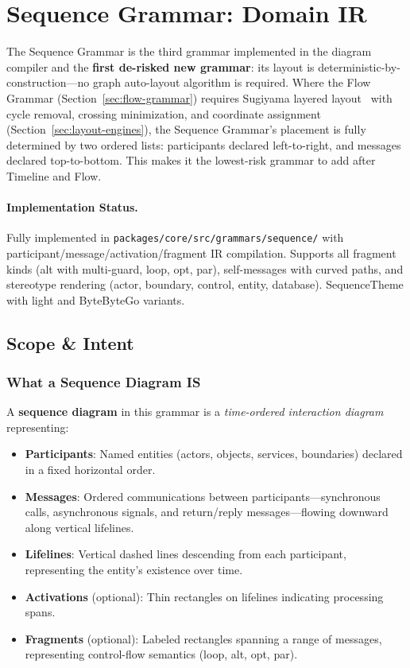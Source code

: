 \section{Sequence Grammar: Domain IR}
\label{sec:sequence-grammar}

The Sequence Grammar is the third grammar implemented in the diagram compiler and the \textbf{first de-risked new grammar}: its layout is deterministic-by-construction---no graph auto-layout algorithm is required. Where the Flow Grammar (Section~\ref{sec:flow-grammar}) requires Sugiyama layered layout~\cite{sugiyama1981} with cycle removal, crossing minimization, and coordinate assignment (Section~\ref{sec:layout-engines}), the Sequence Grammar's placement is fully determined by two ordered lists: participants declared left-to-right, and messages declared top-to-bottom. This makes it the lowest-risk grammar to add after Timeline and Flow.

\paragraph{Implementation Status.}
Fully implemented in \texttt{packages/core/src/grammars/sequence/} with participant/message/activation/fragment IR compilation. Supports all fragment kinds (alt with multi-guard, loop, opt, par), self-messages with curved paths, and stereotype rendering (actor, boundary, control, entity, database). SequenceTheme with light and ByteByteGo variants.

\subsection{Scope \& Intent}
\label{sec:sequence-scope}

\subsubsection{What a Sequence Diagram IS}

A \textbf{sequence diagram} in this grammar is a \emph{time-ordered interaction diagram} representing:

\begin{itemize}
  \item \textbf{Participants}: Named entities (actors, objects, services, boundaries) declared in a fixed horizontal order.
  \item \textbf{Messages}: Ordered communications between participants---synchronous calls, asynchronous signals, and return/reply messages---flowing downward along vertical lifelines.
  \item \textbf{Lifelines}: Vertical dashed lines descending from each participant, representing the entity's existence over time.
  \item \textbf{Activations} (optional): Thin rectangles on lifelines indicating processing spans.
  \item \textbf{Fragments} (optional): Labeled rectangles spanning a range of messages, representing control-flow semantics (loop, alt, opt, par).
\end{itemize}

